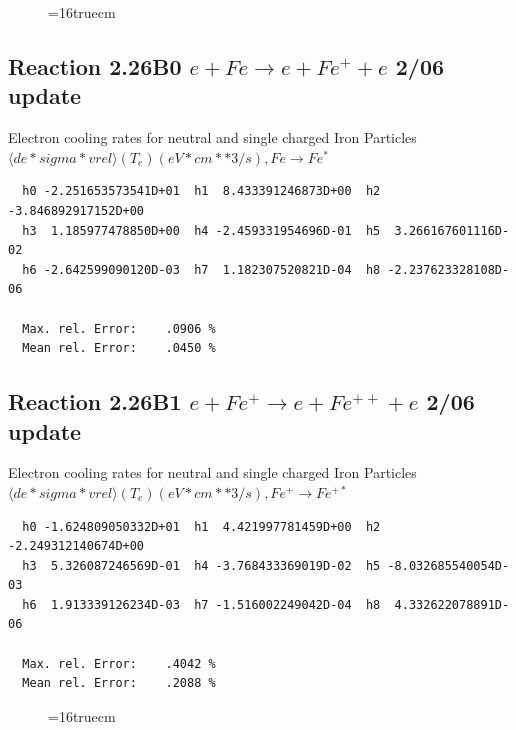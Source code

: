 \documentclass[12pt,dvips]{article}
\begin{document}
\begin{figure} \label{2.18Bl}
\epsfxsize=16truecm
\end{figure}
\newpage


\subsection{
Reaction 2.26B0 $e + Fe  \rightarrow e + Fe^+  + e$ 2/06 update
}

  Electron cooling rates for neutral and single
  charged Iron Particles
 $ \langle de*sigma*vrel \rangle(T_e)  (eV*cm**3/s), Fe  \rightarrow Fe^* $

\begin{small}\begin{verbatim}
  h0 -2.251653573541D+01  h1  8.433391246873D+00  h2 -3.846892917152D+00
  h3  1.185977478850D+00  h4 -2.459331954696D-01  h5  3.266167601116D-02
  h6 -2.642599090120D-03  h7  1.182307520821D-04  h8 -2.237623328108D-06

  Max. rel. Error:    .0906 %
  Mean rel. Error:    .0450 %

\end{verbatim}\end{small}


\subsection{
Reaction 2.26B1 $e + Fe^+ \rightarrow e + Fe^{++} + e$ 2/06 update
}

  Electron cooling rates for neutral and single
  charged Iron Particles
 $  \langle de*sigma*vrel \rangle(T_e)  (eV*cm**3/s), Fe^+ \rightarrow Fe^{+*} $

\begin{small}\begin{verbatim}
  h0 -1.624809050332D+01  h1  4.421997781459D+00  h2 -2.249312140674D+00
  h3  5.326087246569D-01  h4 -3.768433369019D-02  h5 -8.032685540054D-03
  h6  1.913339126234D-03  h7 -1.516002249042D-04  h8  4.332622078891D-06

  Max. rel. Error:    .4042 %
  Mean rel. Error:    .2088 %

\end{verbatim}\end{small}

\begin{figure} \label{2.26Bl}
\epsfxsize=16truecm
\end{figure}
\newpage
\end{document}
